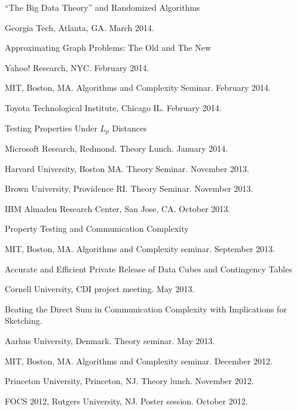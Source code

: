 \documentclass[11pt]{article}
\newenvironment{innerlist}[1][\enskip\textbullet]%
        {\begin{compactitem}[#1]}{\end{compactitem}}
\begin{document}
\begin{innerlist}
\item ``The Big Data Theory'' and Randomized Algorithms
\begin{innerlist}
\item Georgia Tech, Atlanta, GA. March 2014.
\end{innerlist}
\item Approximating Graph Problems: The Old and The New
\begin{innerlist}
\item Yahoo! Research, NYC. February 2014.
\item MIT, Boston, MA. Algorithms and Complexity Seminar. February 2014.
\item Toyota Technological Institute, Chicago IL. February 2014.
\end{innerlist}
\item Testing Properties Under $L_p$ Distances
\begin{innerlist}
\item Microsoft Research, Redmond. Theory Lunch. January 2014.
\item Harvard University, Boston MA. Theory Seminar. November 2013.
\item Brown University, Providence RI. Theory Seminar. November 2013.
\item IBM Almaden Research Center, San Jose, CA. October 2013.
\end{innerlist}

\item Property Testing and Communication Complexity
\begin{innerlist}
\item MIT, Boston, MA. Algorithms and Complexity seminar. September 2013.
\end{innerlist}

\item Accurate and Efficient Private Release of Data Cubes and Contingency Tables
\begin{innerlist}
\item Cornell University, CDI project meeting. May 2013.
\end{innerlist}

\item Beating the Direct Sum in Communication Complexity with Implications for Sketching.
\begin{innerlist}
\item Aarhus University, Denmark. Theory seminar. May 2013.
\item MIT, Boston, MA. Algorithms and Complexity seminar. December 2012.
\item Princeton University, Princeton, NJ. Theory lunch. November 2012.
\item FOCS 2012, Rutgers University, NJ. Poster session. October 2012.
\end{innerlist}


\end{innerlist}
\end{document}
